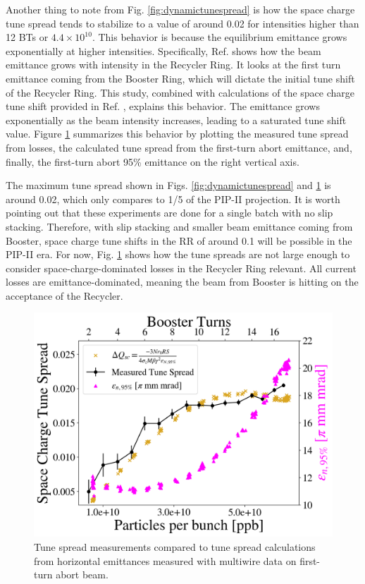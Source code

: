 Another thing to note from Fig. \ref{fig:dynamictunespread} is how the space charge tune spread tends to stabilize to a value of around 0.02 for intensities higher than 12 BTs or $4.4\times 10^{10}$. This behavior is because the equilibrium emittance grows exponentially at higher intensities. Specifically, Ref. \cite{betiay} shows how the beam emittance grows with intensity in the Recycler Ring. It looks at the first turn emittance coming from the Booster Ring, which will dictate the initial tune shift of the Recycler Ring. This study, combined with calculations of the space charge tune shift provided in Ref. \cite{zhang}, explains this behavior. The emittance grows exponentially as the beam intensity increases, leading to a saturated tune shift value. Figure \ref{fig:tunespread} summarizes this behavior by plotting the measured tune spread from losses, the calculated tune spread from the first-turn abort emittance, and, finally, the first-turn abort 95\% emittance on the right vertical axis.   

The maximum tune spread shown in Figs. \ref{fig:dynamictunespread} and \ref{fig:tunespread} is around 0.02, which only compares to 1/5 of the PIP-II projection. It is worth pointing out that these experiments are done for a single batch with no slip stacking. Therefore, with slip stacking and smaller beam emittance coming from Booster, space charge tune shifts in the RR of around 0.1 will be possible in the PIP-II era. For now, Fig. \ref{fig:tunespread} shows how the tune spreads are not large enough to consider space-charge-dominated losses in the Recycler Ring relevant. All current losses are emittance-dominated, meaning the beam from Booster is hitting on the acceptance of the Recycler.  

\begin{figure}[H]
    \centering
    \includegraphics[width=\columnwidth]{chapter6/tune_spread.png}
    \caption{Tune spread measurements compared to tune spread calculations from horizontal emittances measured with multiwire data on first-turn abort beam.}
    \label{fig:tunespread}
   \vspace{-1.25em}
\end{figure}

